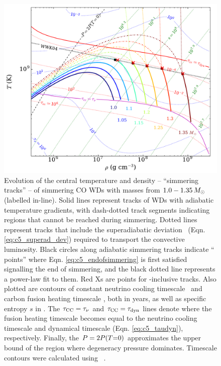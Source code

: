 \begin{figure}
\centering
\includegraphics[angle=0,width=1.0\columnwidth]{chapter5_zhu+16/figures/runaway_rhot.pdf}
\caption{Evolution of the central temperature and density -- ``simmering tracks'' -- of simmering CO WDs with masses from $1.0 - 1.35\,\Msun$ (labelled in-line).  Solid lines represent tracks of WDs with adiabatic temperature gradients, with dash-dotted track segments indicating regions that cannot be reached during simmering.  Dotted lines represent tracks that include the superadiabatic deviation \dnabconv\ (Eqn. \ref{eq:c5_superad_dev}) required to transport the convective luminosity.  Black circles along adiabatic simmering tracks indicate ``\citeal{wooswk04} points'' where Eqn. \ref{eq:c5_endofsimmering} is first satisfied signalling the end of simmering, and the black dotted \citeal{wooswk04} line represents a power-law fit to them.  Red Xs are \citeal{wooswk04} points for \dnabconv-inclusive tracks.  Also plotted are contours of constant neutrino cooling timescale \taunu\ and carbon fusion heating timescale \taucc, both in years, as well as specific entropy $s$ in \ergpKg.  The $\taucc = \taunu$ and $\taucc = \taudyn$ lines denote where the fusion heating timescale becomes equal to the neutrino cooling timescale and dynamical timescale (Eqn. \ref{eq:c5_taudyn}), respectively.  Finally, the $P = 2P(T\mathrm{=}0)$ approximates the upper bound of the region where degeneracy pressure dominates.  Timescale contours were calculated using \mesa\ \citep{paxt+11}.}
\label{fig:c5_runaway_rhot}
\end{figure}

